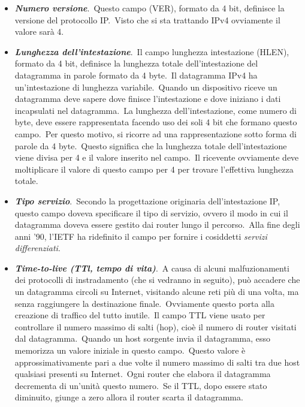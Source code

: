 \begin{itemize}
    \item \textbf{\emph{Numero versione}}.\
          Questo campo (VER), formato da 4 bit, definisce la versione del protocollo IP.\
          Visto che si sta trattando IPv4 ovviamente il valore sarà 4.
    \item \textbf{\emph{Lunghezza dell'intestazione}}.\
          Il campo lunghezza intestazione (H\-LEN), formato da 4 bit, definisce la lunghezza totale dell'intestazione del datagramma in parole formato da 4 byte.\
          Il datagramma IPv4 ha un'intestazione di lunghezza variabile.\
          Quando un dispositivo riceve un datagramma deve sapere dove finisce l'intestazione e dove iniziano i dati incapsulati nel datagramma.\
          La lunghezza dell'intestazione, come numero di byte, deve essere rappresentata facendo uso dei soli 4 bit che formano questo campo.\
          Per questo motivo, si ricorre ad una rappresentazione sotto forma di parole da 4 byte.\
          Questo significa che la lunghezza totale dell'intestazione viene divisa per 4 e il valore inserito nel campo.\
          Il ricevente ovviamente deve moltiplicare il valore di questo campo per 4 per trovare l'effettiva lunghezza totale.
    \item \textbf{\emph{Tipo servizio}}.\
          Secondo la progettazione originaria dell'intestazione IP, questo campo doveva specificare il tipo di servizio, ovvero il modo in cui il datagramma doveva essere gestito dai router lungo il percorso.\
          Alla fine degli anni '90, l'IETF ha ridefinito il campo per fornire i cosiddetti \emph{servizi differenziati}.
    \item \textbf{\emph{Time-to-live (TTl, tempo di vita)}}.\
          A causa di alcuni malfuzionamenti dei protocolli di instradamento (che si vedranno in seguito), può accadere che un datagramma circoli su Internet, visitando alcune reti più di una volta, ma senza raggiungere la destinazione finale.\
          Ovviamente questo porta alla creazione di traffico del tutto inutile.\
          Il campo TTL viene usato per controllare il numero massimo di salti (hop), cioè il numero di router visitati dal datagramma.\
          Quando un host sorgente invia il datagramma, esso memorizza un valore iniziale in questo campo.\
          Questo valore è approssimativamente pari a due volte il numero massimo di salti tra due host qualsiasi presenti su Internet.\
          Ogni router che elabora il datagramma decrementa di un'unità questo numero.\
          Se il TTL, dopo essere stato diminuito, giunge a zero allora il router scarta il datagramma.

\end{itemize}
